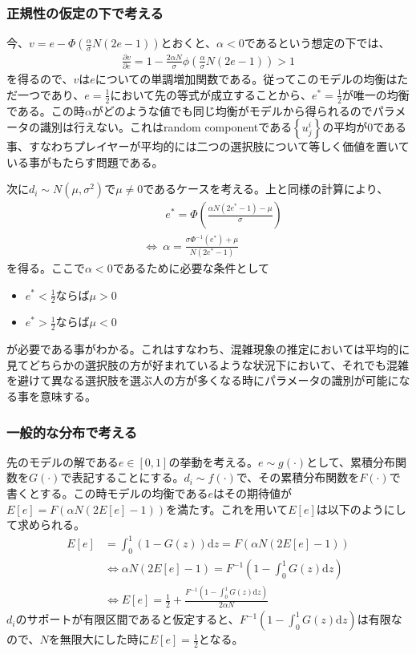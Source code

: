 \documentclass{jsarticle}
\begin{document}
\subsubsection{正規性の仮定の下で考える}
今、$v = e - \Phi \left(\frac{\alpha}{\sigma}N(2e - 1) \right)$とおくと、$\alpha < 0$であるという想定の下では、
\begin{align*}
	\frac{\partial v}{\partial e} = 1 - \frac{2\alpha N}{\sigma}\phi \left( \frac{\alpha}{\sigma}N(2e - 1) \right) > 1
\end{align*}
を得るので、$v$は$e$についての単調増加関数である。従ってこのモデルの均衡はただ一つであり、$e = \frac{1}{2}$において先の等式が成立することから、$e^* = \frac{1}{2}$が唯一の均衡である。この時$\alpha$がどのような値でも同じ均衡がモデルから得られるのでパラメータの識別は行えない。これはrandom componentである$\left\{u_j^i\right\}$の平均が0である事、すなわちプレイヤーが平均的には二つの選択肢について等しく価値を置いている事がもたらす問題である。

次に$d_i \sim N(\mu, \sigma^2)$で$\mu \neq 0$であるケースを考える。上と同様の計算により、
\begin{align*}
	&\qquad e^* = \Phi \left(\frac{\alpha N (2 e^* -1) - \mu}{\sigma}\right)\\[8pt]
	&\Leftrightarrow\ \alpha = \frac{\sigma \Phi^{-1}\left( e^* \right) + \mu}{N(2 e^* -1)}
\end{align*}
を得る。ここで$\alpha < 0$であるために必要な条件として
\begin{itemize}
	\item $e^* < \frac{1}{2}$ならば$\mu > 0$
	\item $e^* > \frac{1}{2}$ならば$\mu < 0$
\end{itemize}
が必要である事がわかる。これはすなわち、混雑現象の推定においては平均的に見てどちらかの選択肢の方が好まれているような状況下において、それでも混雑を避けて異なる選択肢を選ぶ人の方が多くなる時にパラメータの識別が可能になる事を意味する。

\subsubsection{一般的な分布で考える}
先のモデルの解である$e \in [0,1]$の挙動を考える。$e \sim g(\cdot)$として、累積分布関数を$G(\cdot)$で表記することにする。$d_i \sim f(\cdot)$で、その累積分布関数を$F(\cdot)$で書くとする。この時モデルの均衡である$e$はその期待値が$E[e] = F(\alpha N (2 E[e] - 1))$を満たす。これを用いて$E[e]$は以下のようにして求められる。
\begin{align*}
	E[e] &= \int_0^1 (1 - G(z)) \mathrm{d}z = F(\alpha N (2 E[e] - 1))\\[8pt]
	&\Leftrightarrow \alpha N (2 E[e] -1) = F^{-1}\left(1 - \int_0^1 G(z)\mathrm{d}z \right)\\[8pt]
	&\Leftrightarrow E\left[e\right] = \frac{1}{2} + \frac{F^{-1}\left(1 - \int_0^1 G(z)\mathrm{d}z\right)}{2\alpha N}
\end{align*}
$d_i$のサポートが有限区間であると仮定すると、$F^{-1}\left(1 - \int_0^1 G(z)\mathrm{d}z\right)$は有限なので、$N$を無限大にした時に$E[e] = \frac{1}{2}$となる。
\end{document}
